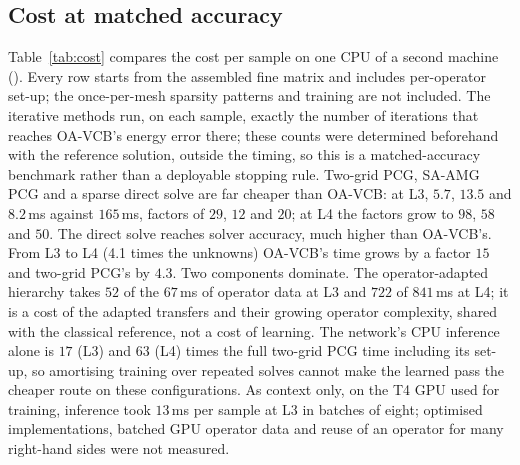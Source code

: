 \subsection{Cost at matched accuracy}\label{sec:cost}

Table~\ref{tab:cost} compares the cost per sample on one CPU of a second machine (). Every row starts
from the assembled fine matrix and includes per-operator set-up; the once-per-mesh sparsity patterns and training are not
included. The iterative methods run, on each sample, exactly the number of iterations that reaches OA-VCB's energy error there;
these counts were determined beforehand with the reference solution, outside the timing, so this is a matched-accuracy
benchmark rather than a deployable stopping rule. Two-grid PCG, SA-AMG PCG and a sparse direct solve are far cheaper than
OA-VCB: at L3, $5.7$, $13.5$ and $8.2$\,ms against $165$\,ms, factors of $29$, $12$ and $20$; at L4 the factors grow to $98$, $58$ and
$50$. The direct solve reaches solver accuracy, much higher than OA-VCB's. From L3 to L4 (4.1 times the unknowns) OA-VCB's time
grows by a factor $15$ and two-grid PCG's by $4.3$. Two components dominate. The operator-adapted hierarchy takes $52$ of the
$67$\,ms of operator data at L3 and $722$ of $841$\,ms at L4; it is a cost of the adapted transfers and their growing operator
complexity, shared with the classical reference, not a cost of learning. The network's CPU inference alone is $17$ (L3) and
$63$ (L4) times the full two-grid PCG time including its set-up, so amortising training over repeated solves cannot make the
learned pass the cheaper route on these configurations. As context only, on the T4 GPU used for training, inference took
$13$\,ms per sample at L3 in batches of eight; optimised implementations, batched GPU operator data and reuse of an operator
for many right-hand sides were not measured.

